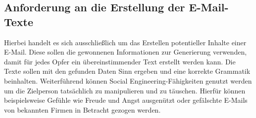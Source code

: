 	\subsection{Anforderung an die Erstellung der E-Mail-Texte}
	Hierbei handelt es sich ausschließlich um das Erstellen potentieller Inhalte einer E-Mail. Diese sollen die gewonnenen Informationen zur Generierung verwenden, damit für jedes Opfer ein übereinstimmender Text erstellt werden kann. Die Texte sollen mit den gefunden Daten Sinn ergeben und eine korrekte Grammatik beinhalten. Weiterführend können Social Engineering-Fähigkeiten genutzt werden um die Zielperson tatsächlich zu manipulieren und zu täuschen. Hierfür können beispielsweise Gefühle wie Freude und Angst ausgenützt oder gefälschte E-Mails von bekannten Firmen in Betracht gezogen werden.

